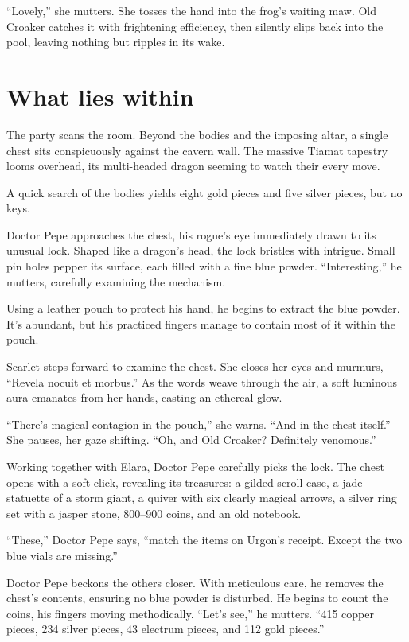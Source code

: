 \documentclass[
  letterpaper,12pt,twoside,twocolumn,openany,
  nodeprecatedcode,bg=full]{dndbook}
\begin{document}
``Lovely,'' she mutters. She tosses the hand into the frog's waiting
maw. Old Croaker catches it with frightening efficiency, then silently
slips back into the pool, leaving nothing but ripples in its wake.

\section{What lies within}\label{what-lies-within}

The party scans the room. Beyond the bodies and the imposing altar, a
single chest sits conspicuously against the cavern wall. The massive
Tiamat tapestry looms overhead, its multi-headed dragon seeming to watch
their every move.

A quick search of the bodies yields eight gold pieces and five silver
pieces, but no keys.

Doctor Pepe approaches the chest, his rogue's eye immediately drawn to
its unusual lock. Shaped like a dragon's head, the lock bristles with
intrigue. Small pin holes pepper its surface, each filled with a fine
blue powder. ``Interesting,'' he mutters, carefully examining the
mechanism.

Using a leather pouch to protect his hand, he begins to extract the blue
powder. It's abundant, but his practiced fingers manage to contain most
of it within the pouch.

Scarlet steps forward to examine the chest. She closes her eyes and
murmurs, ``Revela nocuit et morbus.'' As the words weave through the
air, a soft luminous aura emanates from her hands, casting an ethereal
glow.

``There's magical contagion in the pouch,'' she warns. ``And in the
chest itself.'' She pauses, her gaze shifting. ``Oh, and Old Croaker?
Definitely venomous.''

Working together with Elara, Doctor Pepe carefully picks the lock. The
chest opens with a soft click, revealing its treasures: a gilded scroll
case, a jade statuette of a storm giant, a quiver with six clearly
magical arrows, a silver ring set with a jasper stone, 800--900 coins,
and an old notebook.

``These,'' Doctor Pepe says, ``match the items on Urgon's receipt.
Except the two blue vials are missing.''

Doctor Pepe beckons the others closer. With meticulous care, he removes
the chest's contents, ensuring no blue powder is disturbed. He begins to
count the coins, his fingers moving methodically. ``Let's see,'' he
mutters. ``415 copper pieces, 234 silver pieces, 43 electrum pieces, and
112 gold pieces.''
\end{document}

